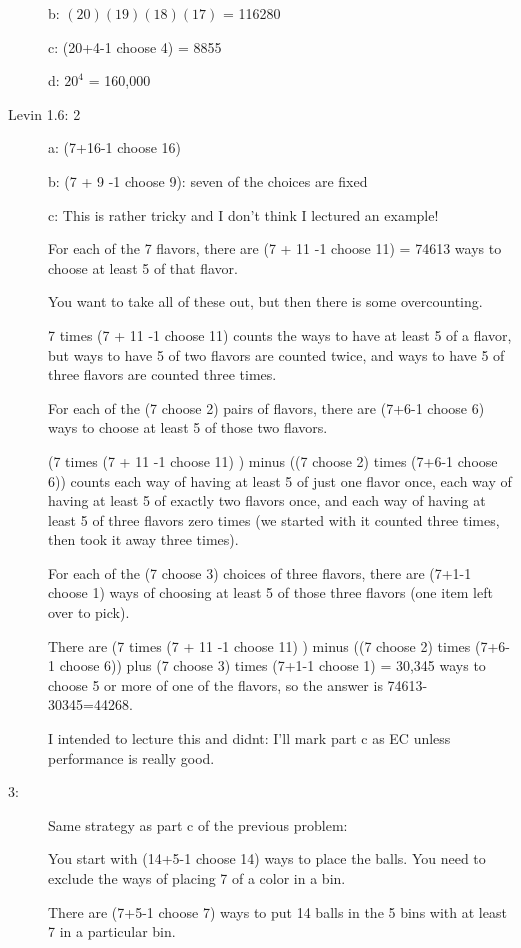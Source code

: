 \documentclass[12pt]{article}
\begin{document}
\begin{description}
b:  $(20)(19)(18)(17)$ = 116280

c:  (20+4-1 choose 4)  = 8855

d:  $20^4$ = 160,000

\item[Levin 1.6: 2]  a:  (7+16-1 choose 16)

b:  (7 + 9 -1 choose 9):  seven of the choices are fixed

c:  This is rather tricky and I don't think I lectured an example!

For each of the 7 flavors, there are (7 + 11 -1 choose 11) = 74613 ways to choose at least 5 of that flavor.

You want to take all of these out, but then there is some overcounting.

7 times (7 + 11 -1 choose 11) counts the ways to have at least 5 of a flavor, but ways to have
5 of two flavors are counted twice, and ways to have 5 of three flavors are counted three times.

For each of the (7 choose 2) pairs of flavors, there are (7+6-1 choose 6) ways to choose at least 5 of those two flavors.

(7 times (7 + 11 -1 choose 11) ) minus ((7 choose 2) times  (7+6-1 choose 6))  counts each way of having at least 5 of just one flavor once, each way of having at least 5 of exactly two flavors once, and each way of having at least 5 of three flavors zero times (we started with it counted three times, then took it away three times).

For each of the (7 choose 3) choices of three flavors, there are (7+1-1 choose 1) ways of choosing at least 5 of those three flavors (one item left over to pick).

There are  (7 times (7 + 11 -1 choose 11) ) minus ((7 choose 2) times  (7+6-1 choose 6)) plus (7 choose 3) times (7+1-1 choose 1) = 30,345 ways to choose 5 or more of one of the flavors, so the answer is 74613-30345=44268.

I intended to lecture this and didnt:  I'll mark part c as EC unless performance is really good.

\item[3:]  Same strategy as part c of the previous problem:  

You start with (14+5-1 choose 14) ways to place the balls.  You need to exclude the ways of placing 7 of a color in a bin.

There are (7+5-1 choose 7) ways to put 14 balls in the 5 bins with at least 7 in a particular bin.


\end{description}
\end{document}
